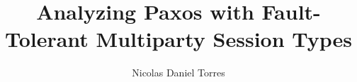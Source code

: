 \documentclass[
    english,
    ruledheaders=section,
    class=report,
    thesis={type=bachelor},
    accentcolor=1b,
    custommargins=true,
    marginpar=false,
    parskip=half-,
    fontsize=11pt,
    pdfa=false,
]{tudapub}
\begin{document}
\title{Analyzing Paxos with Fault-Tolerant Multiparty Session Types}
\author[N. D. Torres]{Nicolas Daniel Torres}
\submissiondate{\today}
\examdate{\today}
\maketitle
\tableofcontents








\end{document}
